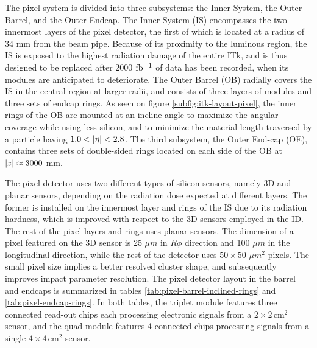 The pixel system is divided into three subsystems: the Inner System, the Outer Barrel, and the Outer Endcap. 
The Inner System (IS) encompasses the two innermost layers of the pixel detector, the first of which is located at a radius of 34 mm from the beam pipe. 
Because of its proximity to the luminous region, the IS is exposed to the highest radiation damage of the entire ITk, and is thus designed to be replaced after 2000 $\mbox{fb\(^{-1}\)}$ of data has been recorded, when its modules are anticipated to deteriorate. 
The Outer Barrel (OB) radially covers the IS in the central region at larger radii, and consists of three layers of modules and three sets of endcap rings. 
As seen on figure \ref{subfig:itk-layout-pixel}, the inner rings of the OB are mounted at an incline angle to maximize the angular coverage while using less silicon, and to minimize the material length traversed by a particle having $1.0<\abs{\eta}<2.8$. 
The third subsystem, the Outer End-cap (OE), contains three sets of double-sided rings located on each side of the OB at $\abs{z}\approx 3000$ mm.

The pixel detector uses two different types of silicon sensors, namely 3D and planar sensors, depending on the radiation dose expected at different layers. 
The former is installed on the innermost layer and rings of the IS due to its radiation hardness, which is improved with respect to the 3D sensors employed in the ID. 
The rest of the pixel layers and rings uses planar sensors. 
The dimension of a pixel featured on the 3D sensor is 25 $\mu m$ in $R\phi$ direction and 100 $\mu m$ in the longitudinal direction, while the rest of the detector uses $50\times 50$ $\mu m^2$ pixels. 
The small pixel size implies a better resolved cluster shape, and subsequently improves impact parameter resolution. 
The pixel detector layout in the barrel and endcaps is summarized in tables \ref{tab:pixel-barrel-inclined-rings} and \ref{tab:pixel-endcap-rings}. 
In both tables, the triplet module features three connected read-out chips each processing electronic signals from a $2\times 2\, \mathrm{cm}^2$ sensor, and the quad module features 4 connected chips processing signals from a single $4\times4\,\mathrm{cm}^2$ sensor. 

